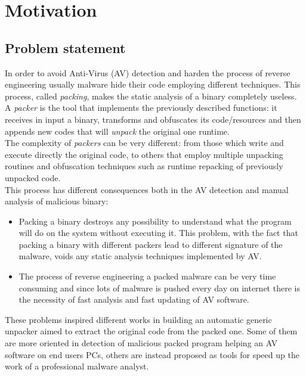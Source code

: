\chapter{Motivation}
\label{chapter2}
\thispagestyle{empty}

\section{Problem statement}

In order to avoid Anti-Virus (AV) detection and harden the process of reverse engineering usually malware hide their code employing different techniques. This process, called \textit{packing}, makes the static analysis of a binary completely useless.\\
A \textit{packer} is the tool that implements the previously described functions: it receives in input a binary, transforms and obfuscates its code/resources and then appends new codes that will \textit{unpack} the original one runtime.\\
The complexity of \textit{packers} can be very different: from those which write and execute directly the original code, to others that employ multiple unpacking routines and obfuscation techniques such as runtime repacking of previously unpacked code.\\
This process has different consequences both in the AV detection and manual analysis of malicious binary:
\begin{itemize}
\item Packing a binary destroys any possibility to understand what the program will do on the system without executing it. This problem, with the fact that packing a binary with different packers lead to different signature of the malware, voids any static analysis techniques implemented by AV. 
\item The process of reverse engineering a packed malware can be very time consuming and since lots of malware is pushed every day on internet there is the necessity of fast analysis and fast updating of AV software.
\end{itemize}
\vspace{\baselineskip}
These problems inspired different works in building an automatic generic unpacker aimed to extract the original code from the packed one. Some of them are more oriented in detection of malicious packed program helping an AV software on end users PCs, others are instead proposed as tools for speed up the work of a professional malware analyst.

